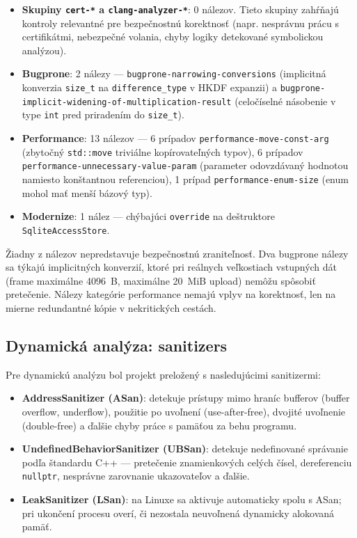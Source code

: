 \documentclass[journal,a4paper,onecolumn]{IEEEtran}
\begin{document}
\begin{itemize}
\item \textbf{Skupiny \texttt{cert-*} a \texttt{clang-analyzer-*}}: 0 nálezov. Tieto skupiny zahŕňajú kontroly relevantné pre bezpečnostnú korektnosť (napr. nesprávnu prácu s certifikátmi, nebezpečné volania, chyby logiky detekované symbolickou analýzou).
\item \textbf{Bugprone}: 2 nálezy --- \texttt{bugprone-narrowing-conversions} (implicitná konverzia \texttt{size\_t} na \texttt{difference\_type} v HKDF expanzii) a \texttt{bugprone-implicit-widening-of-multiplication-result} (celočíselné násobenie v type \texttt{int} pred priradením do \texttt{size\_t}).
\item \textbf{Performance}: 13 nálezov --- 6 prípadov \texttt{performance-move-const-arg} (zbytočný \texttt{std::move} triviálne kopírovateľných typov), 6 prípadov \texttt{performance-unnecessary-value-param} (parameter odovzdávaný hodnotou namiesto konštantnou referenciou), 1 prípad \texttt{performance-enum-size} (enum mohol mať menší bázový typ).
\item \textbf{Modernize}: 1 nález --- chýbajúci \texttt{override} na deštruktore \texttt{SqliteAccessStore}.
\end{itemize}

Žiadny z nálezov nepredstavuje bezpečnostnú zraniteľnosť. Dva bugprone nálezy sa týkajú implicitných konverzií, ktoré pri reálnych veľkostiach vstupných dát (frame maximálne 4096~B, maximálne 20~MiB upload) nemôžu spôsobiť pretečenie. Nálezy kategórie performance nemajú vplyv na korektnosť, len na mierne redundantné kópie v nekritických cestách.

\subsection{Dynamická analýza: sanitizers}

Pre dynamickú analýzu bol projekt preložený s nasledujúcimi sanitizermi:

\begin{itemize}
\item \textbf{AddressSanitizer (ASan)}\cite{AddressSanitizer}: detekuje prístupy mimo hraníc bufferov (buffer overflow, underflow), použitie po uvoľnení (use-after-free), dvojité uvoľnenie (double-free) a ďalšie chyby práce s pamäťou za behu programu.
\item \textbf{UndefinedBehaviorSanitizer (UBSan)}: detekuje nedefinované správanie podľa štandardu C++ --- pretečenie znamienkových celých čísel, dereferenciu \texttt{nullptr}, nesprávne zarovnanie ukazovateľov a ďalšie.
\item \textbf{LeakSanitizer (LSan)}: na Linuxe sa aktivuje automaticky spolu s ASan; pri ukončení procesu overí, či nezostala neuvoľnená dynamicky alokovaná pamäť.
\end{itemize}
\end{document}
